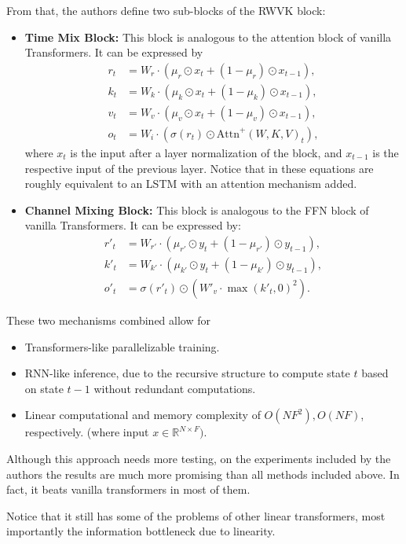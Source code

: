 From that, the authors define two sub-blocks of the RWVK block:
\begin{itemize}
    \item \textbf{Time Mix Block:} This block is analogous to the attention block of vanilla Transformers. It can be expressed by 
    \begin{align*}
        r_t &= W_r \cdot (\mu_r \odot x_t + (1 - \mu_r) \odot x_{t-1}), \\ 
        k_t &= W_k \cdot (\mu_k \odot x_t + (1 - \mu_k) \odot x_{t-1}), \\ 
        v_t &= W_v \cdot (\mu_v \odot x_t + (1 - \mu_v) \odot x_{t-1}), \\ 
        o_t &= W_i \cdot (\sigma(r_t) \odot \text{Attn}^+ (W, K, V)_t),
    \end{align*}
    where $x_t$ is the input after a layer normalization of the block, and $x_{t-1}$ is the respective input of the previous layer.
    Notice that in these equations are roughly equivalent to an LSTM with an attention mechanism added.
    \item \textbf{Channel Mixing Block:} This block is analogous to the FFN block of vanilla Transformers. It can be expressed by:
    \begin{align*}
        r'_t &= W_{r'} \cdot (\mu_{r'} \odot y_t + (1 - \mu_{r'}) \odot y_{t-1}), \\ 
        k'_t &= W_{k'} \cdot (\mu_{k'} \odot y_t + (1 - \mu_{k'}) \odot y_{t-1}), \\ 
        o'_t &= \sigma(r'_t) \odot (W'_v \cdot \max(k'_t, 0)^2).
    \end{align*}
\end{itemize}

These two mechanisms combined allow for
\begin{itemize}
    \item Transformers-like parallelizable training.
    \item RNN-like inference, due to the recursive structure to compute state $t$ based on state $t-1$ without redundant computations.
    \item Linear computational and memory complexity of  $O(NF^2), O(NF)$, respectively. (where input $x \in \mathbb{R}^{N \times F})$.
\end{itemize}

Although this approach needs more testing, on the experiments included by the authors the results are much more promising than all methods included above. In fact, it beats vanilla transformers in most of them.

Notice that it still has some of the problems of other linear transformers, most importantly the information bottleneck due to linearity.